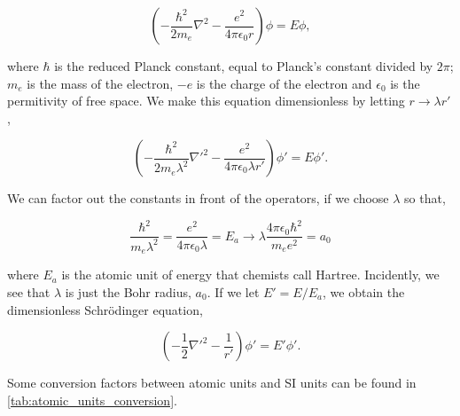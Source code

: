         \begin{equation}
            \left(-\frac{\hbar^2}{2m_e}\nabla^2 - \frac{e^2}{4\pi\epsilon_0 r} \right)
            \phi = E\phi,
        \end{equation}

        where $\hbar$ is the reduced Planck constant, equal to Planck's constant divided by 
        $2\pi$; $m_e$ is the mass of the electron, $-e$ is the charge of the electron and 
        $\epsilon_0$ is the permitivity of free space. We make this equation dimensionless by 
        letting $r \to \lambda r'$,

        \begin{equation}
            \left(-\frac{\hbar^2}{2m_e\lambda^2}\nabla'^2 - \frac{e^2}{4\pi\epsilon_0\lambda r'} \right)
            \phi' = E\phi'.
        \end{equation}

        We can factor out the constants in front of the operators, if we choose $\lambda$ so that,

        \begin{equation}
            \frac{\hbar^2}{m_e\lambda^2} = \frac{e^2}{4\pi \epsilon_0 \lambda} = E_a
            \to \lambda \frac{4\pi\epsilon_0\hbar^2}{m_e e^2} = a_0
        \end{equation}

        where $E_a$ is the atomic unit of energy that chemists call Hartree. Incidently,
        we see that $\lambda$ is just the Bohr radius, $a_0$. If we let $E' = E/E_a$, we 
        obtain the dimensionless Schrödinger equation,

        \begin{equation}
            \left(-\frac{1}{2}\nabla'^2 - \frac{1}{r'} \right) \phi' = E'\phi'.
        \end{equation}

        Some conversion factors between atomic units and SI units can be found in
        \autoref{tab:atomic_units_conversion}.

